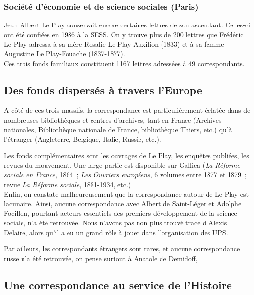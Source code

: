 \subsubsection{Société d'économie et de science sociales (Paris)}

Jean Albert Le Play conservait encore certaines lettres de son ascendant. Celles-ci ont été confiées en 1986 à la SESS. On y trouve plus de 200 lettres que Frédéric Le Play adressa à sa mère Rosalie Le Play-Auxilion (1833) et à sa femme Augustine Le Play-Fouache (1837-1877).\\

Ces trois fonds familiaux constituent 1167 lettres adressées à 49 correspondants.

\subsection{Des fonds dispersés à travers l'Europe}

A côté de ces trois massifs, la correspondance est particulièrement éclatée dans de nombreuses bibliothèques et centres d’archives, tant en France (Archives nationales, Bibliothèque nationale de France, bibliothèque Thiers, etc.) qu’à l’étranger (Angleterre, Belgique, Italie, Russie, etc.).

Les fonds complémentaires sont les ouvrages de Le Play, les enquêtes publiées, les revues du mouvement. Une large partie est disponible sur Gallica (\emph{La Réforme sociale en France}, 1864 ; \emph{Les Ouvriers européens}, 6 volumes entre 1877 et 1879 ; revue \emph{La Réforme sociale}, 1881-1934, etc.)\\
   
Enfin, on constate malheureusement que la correspondance autour de Le Play est lacunaire. Ainsi, aucune correspondance avec Albert de Saint-Léger et Adolphe Focillon, pourtant acteurs essentiels des premiers développement de la science sociale, n'a été retrouvée. Nous n'avons pas non plus trouvé trace d'Alexis Delaire, alors qu'il a eu un grand rôle à jouer dans l'organisation des UPS.

Par ailleurs, les correspondants étrangers sont rares, et aucune correspondance russe n'a été retrouvée, on pense surtout à Anatole de Demidoff, 


\subsection{Une correspondance au service de l'Histoire}

